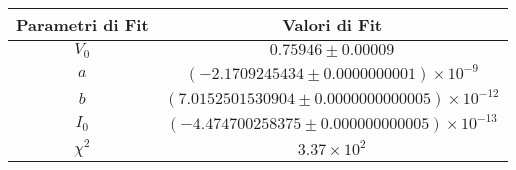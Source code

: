 \begin{tabular}{cc}
\hline
	Parametri di Fit & Valori di Fit\\ 
\hline
	$V_0$ & $0.75946\pm0.00009$ \\
	$a$ & $(-2.1709245434\pm0.0000000001)\times 10^{-9}$ \\
	$b$ & $(7.0152501530904\pm0.0000000000005)\times 10^{-12}$ \\
	$I_0$ & $(-4.474700258375\pm0.000000000005)\times 10^{-13}$ \\
	$\chi^2$ & $3.37\times 10^{2}$ \\
\hline
\end{tabular}
